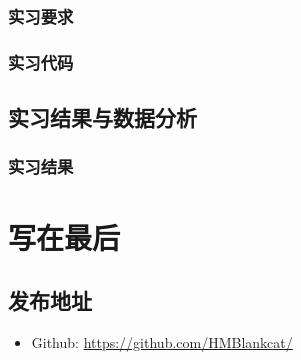 \documentclass[12pt,hyperref,a4paper,UTF8]{ctexart}
\begin{document}
\subsubsection{实习要求}


\subsubsection{实习代码}


\subsection{实习结果与数据分析}
\subsubsection{实习结果}



%
%
%
%
%
%




\section{写在最后}
\subsection{发布地址}
\begin{itemize}
    \item Github: \url{https://github.com/HMBlankcat/}
\end{itemize}
\end{document}
